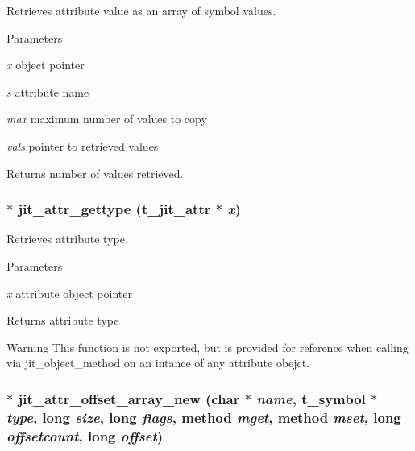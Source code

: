 Retrieves attribute value as an array of symbol values. 
\begin{DoxyParams}{Parameters}
\item[{\em x}]object pointer \item[{\em s}]attribute name \item[{\em max}]maximum number of values to copy \item[{\em vals}]pointer to retrieved values\end{DoxyParams}
\begin{DoxyReturn}{Returns}
number of values retrieved. 
\end{DoxyReturn}
\hypertarget{group__attrmod_gae0ff1b6ee9a3303bbd9a0b4416640c0b}{
\subsubsection[{jit\_\-attr\_\-gettype}]{ $\ast$ jit\_\-attr\_\-gettype ({\bf t\_\-jit\_\-attr} $\ast$ {\em x})}}
\label{group__attrmod_gae0ff1b6ee9a3303bbd9a0b4416640c0b}


Retrieves attribute type. 
\begin{DoxyParams}{Parameters}
\item[{\em x}]attribute object pointer\end{DoxyParams}
\begin{DoxyReturn}{Returns}
attribute type
\end{DoxyReturn}
\begin{DoxyWarning}{Warning}
This function is not exported, but is provided for reference when calling via jit\_\-object\_\-method on an intance of any attribute obejct. 
\end{DoxyWarning}
\hypertarget{group__attrmod_ga8da2f33df7efd0c23b0b7a68ec402724}{
\subsubsection[{jit\_\-attr\_\-offset\_\-array\_\-new}]{ $\ast$ jit\_\-attr\_\-offset\_\-array\_\-new (char $\ast$ {\em name}, \/  {\bf t\_\-symbol} $\ast$ {\em type}, \/  long {\em size}, \/  long {\em flags}, \/  {\bf method} {\em mget}, \/  {\bf method} {\em mset}, \/  long {\em offsetcount}, \/  long {\em offset})}}
\label{group__attrmod_ga8da2f33df7efd0c23b0b7a68ec402724}


